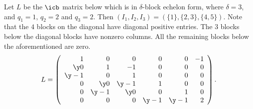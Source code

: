 \begin{example}
Let $L$ be the $\icb$ matrix below which is in $\delta$-block echelon
form, where $\delta=3$, and $q_1=1$, $q_2=2$ and $q_3=2$. Then
$(I_1,I_2,I_3)=(\{1\},\{2,3\},\{4,5\})$. Note that the $4$ blocks on
the diagonal have diagonal positive entries. The $3$ blocks below the
diagonal blocks have nonzero columns. All the remaining blocks below
the aforementioned are zero.
\begin{eqnarray*}
L=\left(\begin{array}{rrrrrr}
1&0&0&0&0&-1\\
\y0&1&-1&0&0&0\\
\y-1&0&1&0&0&0\\
0&\y0&\y-1&1&0&0\\
0&\y-1&\y0&0&1&0\\
0&0&0&\y-1&\y-1&2\\
\end{array}\right).
\end{eqnarray*}
\end{example}

